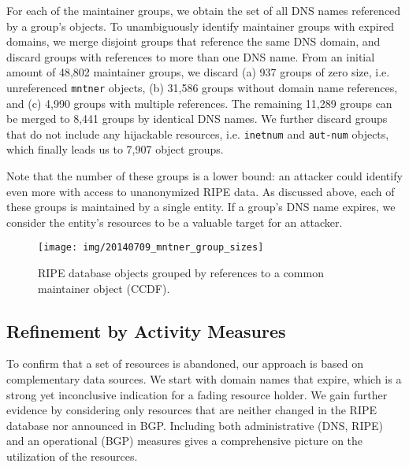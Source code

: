 \documentclass{llncs}
\begin{document}
For each of the maintainer groups, we obtain the set of all DNS names referenced by a group's objects. To unambiguously identify maintainer groups with expired domains, we merge disjoint groups that reference the same DNS domain, and discard groups with references to more than one DNS name. From an initial amount of 48,802 maintainer groups, we discard (a) 937 groups of zero size, i.e. unreferenced \texttt{mntner} objects, (b) 31,586 groups without domain name references, and (c) 4,990 groups with multiple references. The remaining 11,289 groups can be merged to 8,441 groups by identical DNS names. We further discard groups that do not include any hijackable resources, i.e. \texttt{inetnum} and \texttt{aut-num} objects, which finally leads us to 7,907 object groups. 

Note that the number of these groups is a lower bound: an attacker could identify even more with access to unanonymized RIPE data.
As discussed above, each of these groups is maintained by a single entity. If a group's DNS name expires, we consider the entity's resources to be a valuable target for an attacker. 

\begin{figure}[t!]
\centering
\texttt{[image: img/20140709\_mntner\_group\_sizes]}
\vspace{-9pt}
\caption{RIPE database objects grouped by references to a common maintainer object (CCDF).}
\label{fig:mntner_group_sizes}
\end{figure}



\subsection{Refinement by Activity Measures}
To confirm that a set of resources is abandoned, our approach is based on complementary data sources. We start with domain names that expire, which is a strong yet inconclusive indication for a fading resource holder. We gain further evidence by considering only resources that are neither changed in the RIPE database nor announced in BGP. Including both administrative (DNS, RIPE) and an operational (BGP) measures gives a comprehensive picture on the utilization of the resources.
\end{document}
